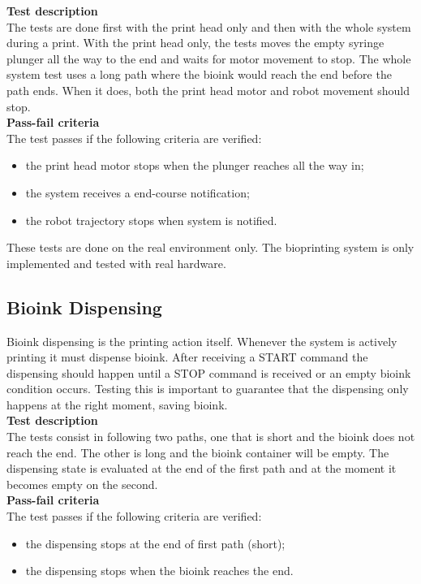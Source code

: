 \textbf{Test description}\\
The tests are done first with the print head only and then with the whole system during a print. With the print head only, the tests moves the empty syringe plunger all the way to the end and waits for motor movement to stop.
The whole system test uses a long path where the bioink would reach the end before the path ends. When it does, both the print head motor and robot movement should stop.\\

\textbf{Pass-fail criteria}\\
The test passes if the following criteria are verified:
\begin{itemize}
    \item the print head motor stops when the plunger reaches all the way in;
    \item the system receives a end-course notification;
    \item the robot trajectory stops when system is notified.
\end{itemize}

These tests are done on the real environment only. The bioprinting system is only implemented and tested with real hardware.


\subsection{Bioink Dispensing}
\label{subsec:system_validation_tests_setup_bioink_dispensing}

Bioink dispensing is the printing action itself. Whenever the system is actively printing it must dispense bioink. After receiving a START command the dispensing should happen until a STOP command is received or an empty bioink condition occurs. Testing this is important to guarantee that the dispensing only happens at the right moment, saving bioink.\\

\textbf{Test description}\\
The tests consist in following two paths, one that is short and the bioink does not reach the end. The other is long and the bioink container will be empty. The dispensing state is evaluated at the end of the first path and at the moment it becomes empty on the second.\\

\textbf{Pass-fail criteria}\\
The test passes if the following criteria are verified:
\begin{itemize}
    \item the dispensing stops at the end of first path (short);
    \item the dispensing stops when the bioink reaches the end.
\end{itemize}


